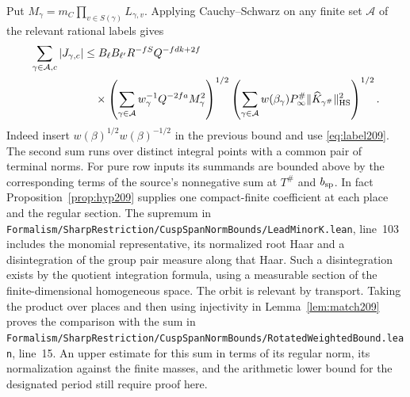 \documentclass[a4paper,11pt]{article}
\theoremstyle{definition}
\theoremstyle{remark}
\newcommand{\srcloc}[2]{{\small\nolinkurl{#1.lean}}, line~#2}
\numberwithin{equation}{section}
\begin{document}
Put \(M_\gamma=m_C\prod_{v\in S(\gamma)}L_{\gamma,v}\).
Applying Cauchy--Schwarz on any finite set \(\mathcal A\) of the
relevant rational labels gives
\begin{align*}
 \sum_{\gamma\in\mathcal A,c}|J_{\gamma,c}|
 &\le B_\ell B_{\ell'}R^{-fS}Q^{-fdk+2f}\\
 &\quad{}\times
 \left(\sum_{\gamma\in\mathcal A}
   w_\gamma^{-1}Q^{-2fa} M_\gamma^2\right)^{1/2}
 \left(\sum_{\gamma\in\mathcal A} w(\beta_\gamma)P^\#_\infty
         \|\widehat K_{\gamma^\#}\|_{\rm HS}^2\right)^{1/2}.
\end{align*}
Indeed insert \(w(\beta)^{1/2}w(\beta)^{-1/2}\) in the
previous bound and use \eqref{eq:label209}. The second sum runs
over distinct integral points with a common pair of terminal norms.
For pure row inputs its summands are bounded above by the
corresponding terms of the source's nonnegative sum at \(T^\#\)
and \(b_{\rm sp}\). In fact Proposition~\ref{prop:hyp209} supplies
one compact-finite coefficient at each place and the regular
section. The supremum in
\srcloc{Formalism/SharpRestriction/CuspSpanNormBounds/LeadMinorK}{103}
includes the monomial representative, its normalized root Haar
and a disintegration of the group pair measure along that Haar.
Such a disintegration exists by the quotient integration formula,
using a measurable section of the finite-dimensional homogeneous
space. The orbit is relevant by transport. Taking the product
over places and then using injectivity in Lemma~\ref{lem:match209}
proves the comparison with the sum in
\srcloc{Formalism/SharpRestriction/CuspSpanNormBounds/RotatedWeightedBound}{15}.
An upper estimate for this sum in terms of its regular norm, its
normalization against the finite masses, and the arithmetic lower
bound for the designated period still require proof here.
\end{document}

